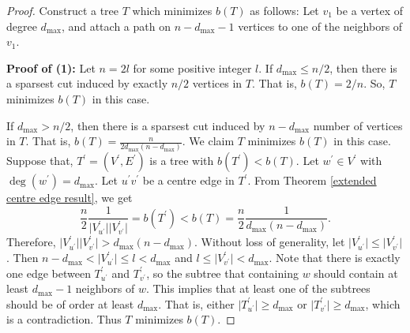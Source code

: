 \documentclass[10pt,a4paper]{amsart}
\begin{document}
\begin{proof}
Construct a tree $T$ which minimizes $b(T)$ as follows:  Let $v_1$ be a vertex of degree $d_{\max}$, and attach a path on $n-d_{\max}-1$ vertices to one of the neighbors of $v_1$.


\noindent\textbf{Proof of (1): } Let $n=2l$ for some positive integer $l$.
If $d_{\max} \leq n/2$, then there is a sparsest cut induced by exactly ${n/2}$ vertices in $T$. That is, $b(T)=2/n$. So, $T$ minimizes $b(T)$ in this case.


If $d_{\max} > n/2$, then there is a sparsest cut induced by $n-d_{\max}$ number of vertices in $T$. That is, $b(T)=\frac{n}{2d_{\max}(n-d_{\max})}$.  We claim $T$ minimizes $b(T)$ in this case. Suppose that,  $T^\prime=(V^\prime,E^\prime)$ is a tree with $b(T^\prime) <b(T)$. Let $w^\prime \in V^\prime$ with $\deg(w^\prime)=d_{\max}$. Let $u^\prime v^\prime$ be a centre edge in $T^\prime$. From Theorem \ref{extended centre edge result}, we get
 $$
\frac{n}{2}\frac{1}{\vert V^\prime_{u^\prime}\vert \vert V^\prime_{v^\prime}\vert}=b(T^\prime)<b(T)=\frac{n}{2}\frac{1}{d_{\max}(n-d_{\max})}.
 $$
  Therefore, $\vert V^\prime_{u^\prime}\vert \vert V^\prime_{v^\prime}\vert > d_{\max}(n-d_{\max})$. Without loss of generality, let $\vert V^\prime_{u^\prime}\vert \leq \vert V^\prime_{v^\prime}\vert$. Then $n-d_{\max} < \vert V^\prime_{u^\prime}\vert \leq l <d_{\max}$ and $l \leq \vert V^\prime_{v^\prime}\vert <d_{\max}$. Note that there is exactly one edge between $T^\prime_{u^\prime}$ and $T^\prime_{v^\prime}$, so the subtree that containing $w$ should contain at least $d_{\max}-1$ neighbors of $w$. This implies that at least one of the subtrees should be of order at least $d_{\max}$. That is, either $\vert T^\prime_{u^{'}} \vert \geq d_{\max}$ or  $\vert T^\prime_{v^{'}} \vert \geq d_{\max}$, which is  a contradiction. Thus $T$ minimizes $b(T)$.


\end{proof}
\end{document}
